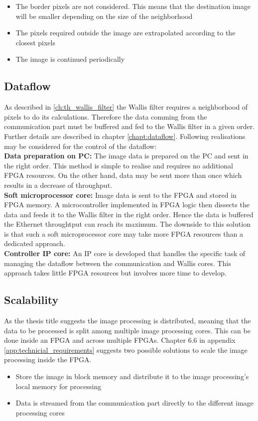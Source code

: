 \begin{itemize}
\item The border pixels are not considered. This means that the destination image will be smaller depending on the size of the neighborhood
\item The pixels required outside the image are extrapolated according to the closest pixels
\item The image is continued periodically
\end{itemize}

\subsection{Dataflow} \label{chapt:mission:dataflow}
As described in \ref{ch:th_wallis_filter} the Wallis filter requires a
neighborhood of pixels to do its calculations. Therefore the data comming from
the communication part must be buffered and fed to the Wallis filter in a given
order. Further details are described in chapter \ref{chapt:dataflow}. Following
realisations may be considered for the control of the dataflow:\\

\textbf{Data preparation on PC:} The image data is prepared on the PC and sent
in the right order. This method is simple to realise and requires no
additional FPGA resources. On the other hand, data may be sent more than once
which results in a decrease of throughput.\\

\textbf{Soft microprocessor core:} Image data is sent to the FPGA and stored in
FPGA memory. A microcontroller implemented in FPGA logic then dissects the data
and feeds it to the Wallis filter in the right order. Hence the data is buffered
the Ethernet throughtput can reach its maximum. The downside to this
solution
is that such a soft microprocessor core may take more FPGA resources than a
dedicated approach.\\

\textbf{Controller IP core:} An IP core is developed that handles the specific
task of managing the dataflow between the communication and Wallis cores. This
approach takes little FPGA resources but involves more time to develop.

\subsection{Scalability} \label{chapt:mission:scalability}
As the thesis title suggests the image processing is distributed, meaning that
the data to be processed is split among multiple image processing cores. This
can be done inside an FPGA and across multiple FPGAs.
Chapter 6.6 in appendix \ref{app:technicial_requirements} suggests two possible
solutions to scale the image processing inside the FPGA.
\begin{itemize}
    \item Store the image in block memory and distribute it to the image
    processing's local memory for processing
    \item Data is streamed from the communication part directly to the different
    image processing cores
\end{itemize}

